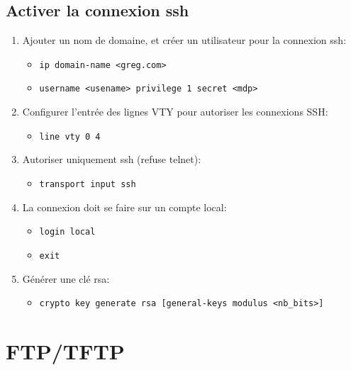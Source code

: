 \documentclass[a4paper]{article}
\begin{document}
\subsection{Activer la connexion ssh}



\begin{enumerate}
    \item Ajouter un nom de domaine, et créer un utilisateur pour la connexion ssh:
    \begin{itemize}[label=\textbf{–}]
        \item \texttt{ip domain-name <greg.com>}
        \item \texttt{username <usename> privilege 1 secret <mdp>}
    \end{itemize}
    \item Configurer l’entrée des lignes VTY pour autoriser les connexions SSH:
    \begin{itemize}[label=\textbf{–}]
        \item \texttt{line vty 0 4}
    \end{itemize}
    \item Autoriser uniquement ssh (refuse telnet):
    \begin{itemize}[label=\textbf{–}]
        \item \texttt{transport input ssh}
    \end{itemize}
    \item La connexion doit se faire sur un compte local:
    \begin{itemize}[label=\textbf{–}]
        \item \texttt{login local}
        \item \texttt{exit}
    \end{itemize}
    \item Générer une clé rsa:
    \begin{itemize}[label=\textbf{–}]
        \item \texttt{crypto key generate rsa [general-keys modulus <nb\_bits>]}
    \end{itemize}
\end{enumerate}










\section{FTP/TFTP}
\end{document}
